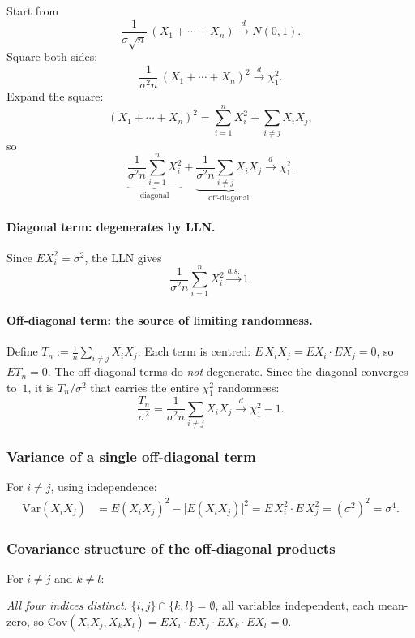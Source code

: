 \documentclass[a4paper,oneside,12pt]{extarticle}
\theoremstyle{plain}
\theoremstyle{definition}
\theoremstyle{remark}
\newcommand*{\Var}{\mathrm{Var}}
\newcommand*{\Cov}{\mathrm{Cov}}
\begin{document}
Start from
\[
  \frac{1}{\sigma\sqrt{n}}\,(X_1+\cdots+X_n)\xrightarrow{d}N(0,1).
\]
Square both sides:
\[
  \frac{1}{\sigma^2 n}\,(X_1+\cdots+X_n)^2\xrightarrow{d}\chi^2_1.
\]
Expand the square:
\[
  (X_1+\cdots+X_n)^2
  = \sum_{i=1}^n X_i^2 + \sum_{i\neq j} X_i X_j,
\]
so
\[
  \underbrace{\frac{1}{\sigma^2 n}\sum_{i=1}^n X_i^2}_{\text{diagonal}}
  +
  \underbrace{\frac{1}{\sigma^2 n}\sum_{i\neq j} X_i X_j}_{\text{off-diagonal}}
  \xrightarrow{d}\chi^2_1.
\]

\paragraph{Diagonal term: degenerates by LLN.}
Since $EX_i^2=\sigma^2$, the LLN gives
\[
  \frac{1}{\sigma^2 n}\sum_{i=1}^n X_i^2 \xrightarrow{a.s.} 1.
\]

\paragraph{Off-diagonal term: the source of limiting randomness.}
Define $T_n := \tfrac{1}{n}\sum_{i\neq j} X_i X_j$.
Each term is centred: $E\,X_iX_j = EX_i\cdot EX_j = 0$, so $ET_n=0$.
The off-diagonal terms do \emph{not} degenerate.  Since the diagonal
converges to~$1$, it is $T_n/\sigma^2$ that carries the entire $\chi^2_1$
randomness:
\[
  \frac{T_n}{\sigma^2}
  = \frac{1}{\sigma^2 n}\sum_{i\neq j}X_iX_j
  \xrightarrow{d} \chi^2_1 - 1.
\]

\subsubsection*{Variance of a single off-diagonal term}

For $i\neq j$, using independence:
\begin{align*}
  \Var(X_iX_j)
  &= E(X_iX_j)^2 - \bigl[E(X_iX_j)\bigr]^2
   = E\,X_i^2\cdot E\,X_j^2
   = (\sigma^2)^2 = \sigma^4.
\end{align*}

\subsubsection*{Covariance structure of the off-diagonal products}

For $i\neq j$ and $k\neq l$:

\smallskip
\noindent\textit{All four indices distinct.}
$\{i,j\}\cap\{k,l\}=\emptyset$, all variables independent, each
mean-zero, so $\Cov(X_iX_j,X_kX_l)=EX_i\cdot EX_j\cdot EX_k\cdot EX_l=0$.
\end{document}
